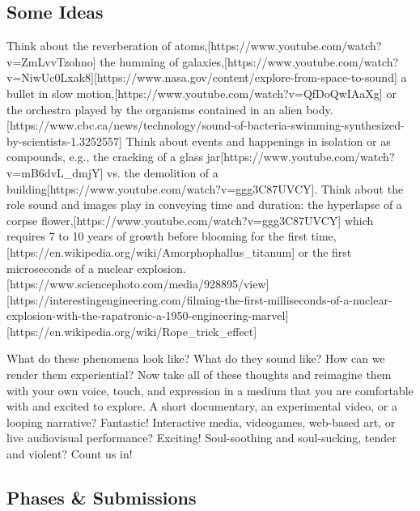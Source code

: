\hypertarget{projideas}{\subsection{Some Ideas}}

Think about the reverberation of atoms,[https://www.youtube.com/watch?v=ZmLvvTzohno] the humming of galaxies,[https://www.youtube.com/watch?v=NiwUc0Lxak8][https://www.nasa.gov/content/explore-from-space-to-sound] a bullet in slow motion,[https://www.youtube.com/watch?v=QfDoQwIAaXg] or the orchestra played by the organisms contained in an alien body.[https://www.cbc.ca/news/technology/sound-of-bacteria-swimming-synthesized-by-scientists-1.3252557] Think about events and happenings in isolation or as compounds, e.g., the cracking of a glass jar[https://www.youtube.com/watch?v=mB6dvL_dmjY] vs. the demolition of a building[https://www.youtube.com/watch?v=ggg3C87UVCY]. Think about the role sound and images play in conveying time and duration: the hyperlapse of a corpse flower,[https://www.youtube.com/watch?v=ggg3C87UVCY] which requires 7 to 10 years of growth before blooming for the first time,[https://en.wikipedia.org/wiki/Amorphophallus_titanum] or the first microseconds of a nuclear explosion.[https://www.sciencephoto.com/media/928895/view][https://interestingengineering.com/filming-the-first-milliseconds-of-a-nuclear-explosion-with-the-rapatronic-a-1950-engineering-marvel][https://en.wikipedia.org/wiki/Rope_trick_effect]

What do these phenomena look like? What do they sound like? How can we render them experiential? Now take all of these thoughts and reimagine them with your own voice, touch, and expression in a medium that you are comfortable with and excited to explore. A short documentary, an experimental video, or a looping narrative? Fantastic! Interactive media, videogames, web-based art, or live audiovisual performance? Exciting! Soul-soothing and soul-sucking, tender and violent? Count us in!


\hypertarget{projphase}{\subsection{Phases \& Submissions}}

